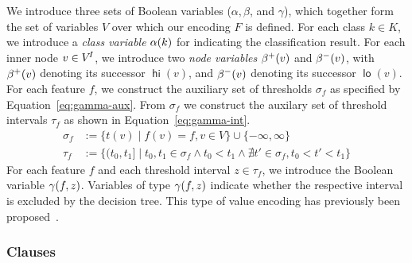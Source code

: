 \documentclass[a4paper, USenglish, cleveref, autoref, thm-restate]{lipics-v2021}
\DeclareMathOperator\hi{\ensuremath{\mathsf{hi}}}
\DeclareMathOperator\lo{\ensuremath{\mathsf{lo}}}
\theoremstyle{definition}
\newtheorem{encoding}{Encoding}[section]
\begin{document}
We introduce three sets of Boolean variables ($\alpha, \beta$, and $\gamma$), which together form the set of variables $V$ over which our encoding $F$ is defined. 
For each class $k \in K$, we introduce a \emph{class variable} $\alpha(k)$ for indicating the classification result. 
For each inner node $v \in V^{\!I}$, we introduce two \emph{node variables} $\beta^+(v)$ and $\beta^-(v)$, with $\beta^+(v)$ denoting its successor $\hi(v)$, and $\beta^-(v)$ denoting its successor $\lo(v)$. 
For each feature $f$, we construct the auxiliary set of thresholds $\sigma_f$ as specified by Equation~\ref{eq:gamma-aux}. 
From $\sigma_f$ we construct the auxilary set of threshold intervals $\tau_f$ as shown in Equation~\ref{eq:gamma-int}. 
%
\begin{align}
\label{eq:gamma-aux}
\sigma_f &:= \{ t(v) \mid f(v) = f, v \in V \} \cup \{-\infty, \infty\}\\
\label{eq:gamma-int}
\tau_f &:= \{ (t_0, t_1] \mid t_0, t_1 \in \sigma_f \land t_0 < t_1 \land \nexists t' \in \sigma_f, t_0 < t' < t_1 \}
\end{align}
%
For each feature $f$ and each threshold interval $z \in \tau_f$, we introduce the Boolean variable $\gamma(f,z)$. 
Variables of type $\gamma(f,z)$ indicate whether the respective interval is excluded by the decision tree. 
This type of value encoding has previously been proposed~\cite{Choi:2020:RF}. 

\subsubsection{Clauses}

%
%
%
\end{document}
